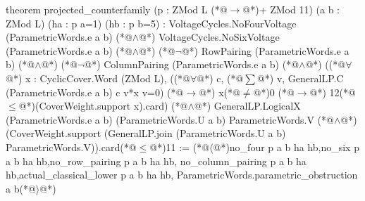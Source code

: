 theorem projected_counterfamily (p : ZMod L (*@$\to$@*)+ ZMod 11) (a b : ZMod L) (ha : p a=1) (hb : p b=5) :
    VoltageCycles.NoFourVoltage (ParametricWords.e a b) (*@$\land$@*)
    VoltageCycles.NoSixVoltage (ParametricWords.e a b) (*@$\land$@*)
    (*@$\neg$@*) RowPairing (ParametricWords.e a b) (*@$\land$@*) (*@$\neg$@*) ColumnPairing (ParametricWords.e a b) (*@$\land$@*)
    ((*@$\forall$@*) x : CyclicCover.Word (ZMod L),
      ((*@$\forall$@*) c, (*@$\sum$@*) v, GeneralLP.C (ParametricWords.e a b) c v*x v=0) (*@$\to$@*)
      x(*@$\ne$@*)0 (*@$\to$@*) 12(*@$\le$@*)(CoverWeight.support x).card) (*@$\land$@*)
    GeneralLP.LogicalX (ParametricWords.e a b) (ParametricWords.U a b) ParametricWords.V (*@$\land$@*)
    (CoverWeight.support (GeneralLP.join (ParametricWords.U a b) ParametricWords.V)).card(*@$\le$@*)11 :=
  (*@$\langle$@*)no_four p a b ha hb,no_six p a b ha hb,no_row_pairing p a b ha hb,
    no_column_pairing p a b ha hb,actual_classical_lower p a b ha hb,
    ParametricWords.parametric_obstruction a b(*@$\rangle$@*)

